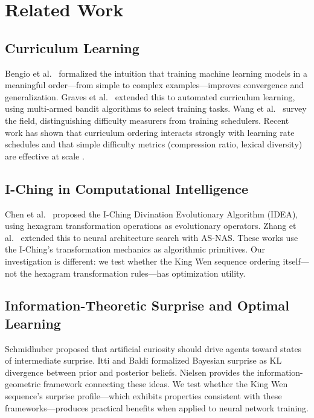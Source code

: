 \documentclass{article}
\begin{document}
\section{Related Work}\label{sec:related}

\subsection{Curriculum Learning}

Bengio et al.\ \cite{bengio2009curriculum} formalized the intuition that training machine learning models in a meaningful order---from simple to complex examples---improves convergence and generalization. Graves et al.\ \cite{graves2017automated} extended this to automated curriculum learning, using multi-armed bandit algorithms to select training tasks. Wang et al.\ \cite{wang2021curriculum} survey the field, distinguishing difficulty measurers from training schedulers. Recent work has shown that curriculum ordering interacts strongly with learning rate schedules \cite{luo2025lrdecay} and that simple difficulty metrics (compression ratio, lexical diversity) are effective at scale \cite{zhang2025curriculum}.

\subsection{I-Ching in Computational Intelligence}

Chen et al.\ \cite{chen2016iching} proposed the I-Ching Divination Evolutionary Algorithm (IDEA), using hexagram transformation operations as evolutionary operators. Zhang et al.\ \cite{zhang2021asnas} extended this to neural architecture search with AS-NAS. These works use the I-Ching's transformation mechanics as algorithmic primitives. Our investigation is different: we test whether the King Wen sequence ordering itself---not the hexagram transformation rules---has optimization utility.

\subsection{Information-Theoretic Surprise and Optimal Learning}

Schmidhuber \cite{schmidhuber2006developmental} proposed that artificial curiosity should drive agents toward states of intermediate surprise. Itti and Baldi \cite{itti2009bayesian} formalized Bayesian surprise as KL divergence between prior and posterior beliefs. Nielsen \cite{Nielsen_2020} provides the information-geometric framework connecting these ideas. We test whether the King Wen sequence's surprise profile---which exhibits properties consistent with these frameworks---produces practical benefits when applied to neural network training.
\end{document}
